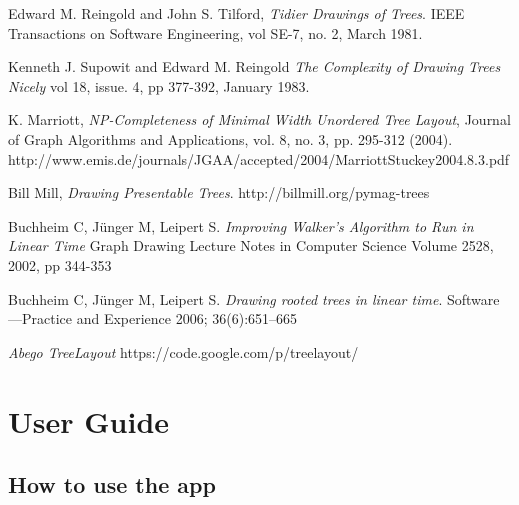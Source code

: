 \documentclass{report}
\begin{document}
\begin{thebibliography}{9}
  Edward M. Reingold and John S. Tilford,
  \emph{Tidier Drawings of Trees}.
  IEEE Transactions on Software Engineering, 
  vol SE-7, no. 2,
  March 1981.

  Kenneth J. Supowit and Edward M. Reingold
  \emph{The Complexity of Drawing Trees Nicely}
  vol 18, issue. 4, pp 377-392,
  January 1983.

  K. Marriott, 
  \emph{NP-Completeness of Minimal Width Unordered Tree Layout}, 
  Journal of Graph Algorithms and Applications, 
  vol. 8, no. 3, pp. 295-312 (2004).
  http://www.emis.de/journals/JGAA/accepted/2004/MarriottStuckey2004.8.3.pdf

  Bill Mill,
  \emph{Drawing Presentable Trees}.
  http://billmill.org/pymag-trees

  Buchheim C, J\"unger M, Leipert S. 
  \emph{Improving Walker's Algorithm to Run in Linear Time}
  Graph Drawing Lecture Notes in Computer Science Volume 2528, 
  2002, pp 344-353

  Buchheim C, J\"unger M, Leipert S. 
  \emph{Drawing rooted trees in linear time}. 
  Software—Practice and Experience 2006; 36(6):651–665

  \emph{Abego TreeLayout}
  https://code.google.com/p/treelayout/

\end{thebibliography}

\chapter{User Guide}
\section{How to use the app}
\end{document}
